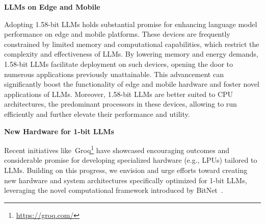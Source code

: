\textbf{LLMs on Edge and Mobile}

Adopting 1.58-bit LLMs holds substantial promise for enhancing language model performance on edge and mobile platforms. These devices are frequently constrained by limited memory and computational capabilities, which restrict the complexity and effectiveness of LLMs. By lowering memory and energy demands, 1.58-bit LLMs facilitate deployment on such devices, opening the door to numerous applications previously unattainable. This advancement can significantly boost the functionality of edge and mobile hardware and foster novel applications of LLMs. Moreover, 1.58-bit LLMs are better suited to CPU architectures, the predominant processors in these devices, allowing  to run efficiently and further elevate their performance and utility.

\textbf{New Hardware for 1-bit LLMs}

Recent initiatives like~Groq\footnote{\url{https://groq.com/}} have showcased encouraging outcomes and considerable promise for developing specialized hardware (e.g., LPUs) tailored to LLMs. Building on this progress, we envision and urge efforts toward creating new hardware and system architectures specifically optimized for 1-bit LLMs, leveraging the novel computational framework introduced by BitNet~\cite{bitnet}.

